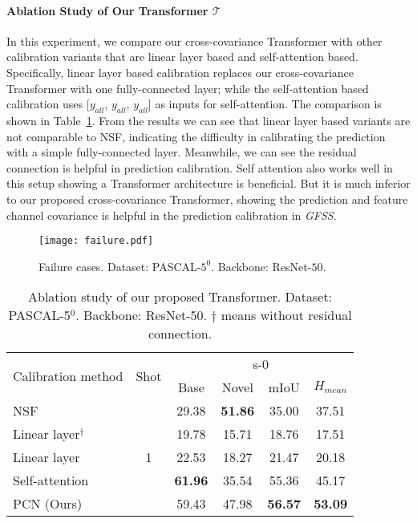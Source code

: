 \documentclass[journal]{IEEEtran}
\begin{document}
\paragraph{Ablation Study of Our Transformer $\mathcal{T}$}
In this experiment, we compare our cross-covariance Transformer with other calibration variants that are linear layer based and self-attention based.
Specifically, linear layer based calibration replaces our cross-covariance Transformer with one fully-connected layer; while the self-attention based calibration uses [$y_{all}$, $y_{all}$, $y_{all}$] as inputs for self-attention.
The comparison is shown in Table~\ref{tab:query_con}. 
From the results we can see that linear layer based variants are not comparable to NSF, indicating the difficulty in calibrating the prediction with a simple fully-connected layer. 
Meanwhile, we can see the residual connection is helpful in prediction calibration.
Self attention also works well in this setup showing a Transformer architecture is beneficial. But it is much inferior to our proposed cross-covariance Transformer, showing the prediction and feature channel covariance is helpful in the prediction calibration in \textit{GFSS}.

\begin{figure}[ht]
    \centering
    \texttt{[image: failure.pdf]}
    \caption{Failure cases. Dataset: PASCAL-$5^0$. Backbone: ResNet-$50$.}
    \label{fig:failure}
\end{figure}

\begin{table}[ht]
    \centering
    \caption{Ablation study of our proposed Transformer.  Dataset: PASCAL-5$^{0}$. Backbone: ResNet-50. $\dag$ means without residual connection.}
\begin{tabular}{l|c|cccc}
    \hline
         \multirow{2}{*}{Calibration method} & \multirow{2}{*}{Shot} & \multicolumn{4}{c}{s-0} \\
         \cline{3-6}
          & & Base & Novel & mIoU & $H_{mean}$ \\
         \hline
          NSF & \multirow{5}{*}{1} & 29.38 & \textbf{51.86} & 35.00 & 37.51 \\
          Linear layer$^\dag$ & & 19.78 & 15.71 & 18.76 & 17.51 \\
          Linear layer & & 22.53 & 18.27 & 21.47 & 20.18 \\
          Self-attention & & \textbf{61.96} & 35.54 & 55.36 & 45.17 \\
          PCN (Ours) & & 59.43 & 47.98 & \textbf{56.57} & \textbf{53.09} \\
    \hline
    \end{tabular}
\label{tab:query_con}
\end{table}
\end{document}
